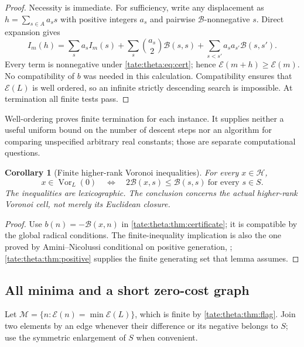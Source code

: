 \documentclass[11pt,letterpaper]{article}
\newtheorem{corollary}[corollary]{Corollary}
\theoremstyle{definition}
\newcommand{\Vor}{\operatorname{Vor}}
\newcommand{\cB}{\mathcal B}
\newcommand{\cH}{\mathcal H}
\newcommand{\cE}{\mathcal E}
\newcommand{\cM}{\mathcal M}
\begin{document}
\begin{proof}
Necessity is immediate. For sufficiency, write any displacement as
$h=\sum_{s\in A}a_ss$ with positive integers $a_s$ and pairwise
$\cB$-nonnegative $s$. Direct expansion gives
\begin{equation}
 I_m(h)=\sum_sa_sI_m(s)+\sum_s\binom{a_s}2\cB(s,s)
   +\sum_{s<s'}a_sa_{s'}\cB(s,s').\label{tate:theta:eq:energydecomp}
\end{equation}
Every term is nonnegative under \eqref{tate:theta:eq:cert}; hence
$\cE(m+h)\ge\cE(m)$. No compatibility of $b$ was needed in this
calculation. Compatibility ensures that $\cE(L)$ is well ordered, so an
infinite strictly descending search is impossible. At termination all
finite tests pass.
\end{proof}

Well-ordering proves finite termination for each instance. It supplies
neither a useful uniform bound on the number of descent steps nor an
algorithm for comparing unspecified arbitrary real constants; those are
separate computational questions.

\begin{corollary}[Finite higher-rank Voronoi inequalities]\label{tate:theta:cor:voronoi}
For every $x\in\cH$,
\[
 x\in\Vor_L(0)
 \quad\Longleftrightarrow\quad
 2\cB(x,s)\le\cB(s,s)\ \text{for every }s\in S.
\]
The inequalities are lexicographic. The conclusion concerns the actual
higher-rank Voronoi cell, not merely its Euclidean closure.
\end{corollary}

\begin{proof}
Use $b(n)=-\cB(x,n)$ in \cref{tate:theta:thm:certificate}; it is
compatible by the global radical conditions. The finite-inequality
implication is also the one proved by Amini--Nicolussi conditional on
positive generation, \cite[Lemma~11.11]{AN}; \cref{tate:theta:thm:positive}
supplies the finite generating set that lemma assumes.
\end{proof}

\subsection{All minima and a short zero-cost graph}

Let $\cM=\{n:\cE(n)=\min\cE(L)\}$, which is finite by
\cref{tate:theta:thm:flag}. Join two elements by an edge whenever their
difference or its negative belongs to $S$; use the symmetric enlargement of
$S$ when convenient.
\end{document}
